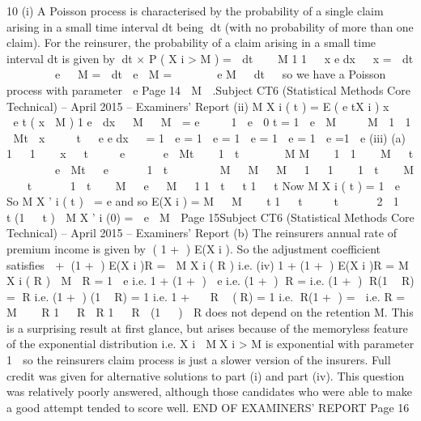 10
(i)
A Poisson process is characterised by the probability of a single claim arising
in a small time interval dt being dt (with no probability of more than one
claim).
For the reinsurer, the probability of a claim arising in a small time interval dt
is given by
dt × P ( X i > M )
=  dt  

M
1
1   x
e dx


x
=  dt    
   e   M
=  dt  e

M
=    
  e
M

 dt


so we have a Poisson process with parameter  e
Page 14

M

.Subject CT6 (Statistical Methods Core Technical) – April 2015 – Examiners’ Report
(ii)
M X i ( t ) = E ( e tX i )
x

   e t ( x  M ) 1 e  dx
  M


M

= e   
 1  e 
0 t
= 1  e

M

 

M
 1

1  Mt  x     t  
e e
dx


= 1  e
= 1  e
= 1  e
= 1  e
= 1  e
=1  e
(iii)
(a)
1

 1  
 x   t  


e    
 e  Mt  
 1  t

  
  M
M


 1
 1  
 M   t  

 

 e  Mt 
 e    
 1  t

  
 
 M
  M
  M
 
1 
 1 

 1  t  
 M
   t  


 1  t  

M

 e


M


1
1  t 
 t
1   t
Now M X i ( t ) = 1  e
So
M X ' i ( t )

= e
and so E(X i ) =
M


M


 t
1   t
 

 t

  

2
 1   t (1   t )

M X ' i (0) =
 e

M

Page 15Subject CT6 (Statistical Methods Core Technical) – April 2015 – Examiners’ Report
(b)
The reinsurers annual rate of premium income is given by ( 1 + )
E(X i ). So the adjustment coefficient satisfies
 + (1 + ) E(X i )R =  M X i ( R )
i.e.
(iv)
1 + (1 + ) E(X i )R = M X i ( R )

M

R = 1  e
i.e. 1 + (1 + )  e
i.e. (1 + ) R =
i.e. (1 + ) R(1  R) = R
i.e. (1 + ) (1  R) = 1
i.e. 1 +   R  (R) = 1
i.e. R(1 + ) = 
i.e. R =

M


 R
1   R
 R
1   R

(1   ) 
R does not depend on the retention M.
This is a surprising result at first glance, but arises because of the memoryless
feature of the exponential distribution
i.e. X i  MX i > M is exponential with parameter
1

so the reinsurers claim process is just a slower version of the insurers.
Full credit was given for alternative solutions to part (i) and part (iv). This question was
relatively poorly answered, although those candidates who were able to make a good attempt
tended to score well.
END OF EXAMINERS’ REPORT
Page 16
